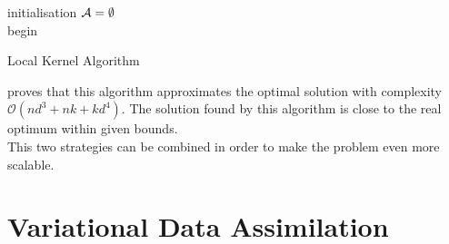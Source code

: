 \begin{algorithm}[h]
 initialisation\;
 $\mathcal{A} = \emptyset$ \\
 begin\;
\caption{Local Kernel Algorithm}
\label{alg:local}
\end{algorithm} 


\citet{krause_near-optimal_2008} proves that this algorithm approximates the optimal solution with complexity $\mathcal{O}(nd^3 + nk + kd^4)$. The solution found by this algorithm is close to the real optimum within given bounds. \\

This two strategies can be combined in order to make the problem even more scalable. 

\section{Variational Data Assimilation}
